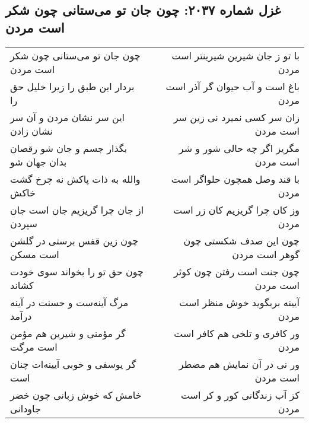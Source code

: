 \begin{center}
\section*{غزل شماره ۲۰۳۷: چون جان تو می‌ستانی چون شکر است مردن}
\label{sec:2037}
\begin{longtable}{l p{0.5cm} r}
چون جان تو می‌ستانی چون شکر است مردن
&&
با تو ز جان شیرین شیرینتر است مردن
\\
بردار این طبق را زیرا خلیل حق را
&&
باغ است و آب حیوان گر آذر است مردن
\\
این سر نشان مردن و آن سر نشان زادن
&&
زان سر کسی نمیرد نی زین سر است مردن
\\
بگذار جسم و جان شو رقصان بدان جهان شو
&&
مگریز اگر چه حالی شور و شر است مردن
\\
والله به ذات پاکش نه چرخ گشت خاکش
&&
با قند وصل همچون حلواگر است مردن
\\
از جان چرا گریزیم جان است جان سپردن
&&
وز کان چرا گریزیم کان زر است مردن
\\
چون زین قفس برستی در گلشن است مسکن
&&
چون این صدف شکستی چون گوهر است مردن
\\
چون حق تو را بخواند سوی خودت کشاند
&&
چون جنت است رفتن چون کوثر است مردن
\\
مرگ آینه‌ست و حسنت در آینه درآمد
&&
آیینه بربگوید خوش منظر است مردن
\\
گر مؤمنی و شیرین هم مؤمن است مرگت
&&
ور کافری و تلخی هم کافر است مردن
\\
گر یوسفی و خوبی آیینه‌ات چنان است
&&
ور نی در آن نمایش هم مضطر است مردن
\\
خامش که خوش زبانی چون خضر جاودانی
&&
کز آب زندگانی کور و کر است مردن
\\
\end{longtable}
\end{center}
